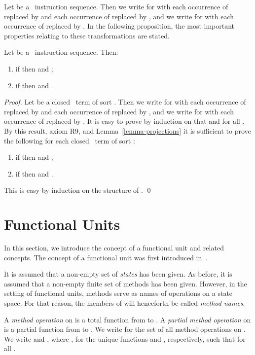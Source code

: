 \documentclass[fleqn]{llncs}
\begin{document}
Let  be a \PGLBbt\ instruction sequence.
Then we write  for  with each occurrence of 
replaced by  and each occurrence of  replaced by
, and we write  for  with each occurrence of
 replaced by .
In the following proposition, the most important properties relating to
these transformations are stated.
\begin{proposition}
\label{prop-swap-f2d}
Let  be a \PGLBbt\ instruction sequence.
Then:
\begin{enumerate}
\item
if  then  and
;
\item
if  then  and
.
\end{enumerate}
\end{proposition}
\begin{proof}
Let  be a closed \BTAbt\ term of sort .
Then we write  for  with each occurrence of 
replaced by  and each occurrence of  replaced by
, and we write  for  with each occurrence of
 replaced by .
It is easy to prove by induction on  that
 and
 for all .
By this result, axiom R9, and Lemma~\ref{lemma-projections} it is
sufficient to prove the following for each closed \BTAbt\ term  of
sort :
\begin{enumerate}
\item[]
if  then  and
;
\item[]
if  then  and
.
\end{enumerate}
This is easy by induction on the structure of .
\qed
\end{proof}

\section{Functional Units}
\label{sect-func-unit}

In this section, we introduce the concept of a functional unit and
related concepts.
The concept of a functional unit was first introduced in~\cite{BM09l}.

It is assumed that a non-empty set  of \emph{states} has been
given.
As before, it is assumed that a non-empty finite set  of methods
has been given.
However, in the setting of functional units, methods serve as names of
operations on a state space.
For that reason, the members of  will henceforth be called
\emph{method names}.

A \emph{method operation} on  is a total function from  to
.
A \emph{partial method operation} on  is a partial function from
 to .
We write  for the set of all method operations on .
We write  and , where , for the unique
functions  and ,
respectively, such that  for all .
\end{document}
